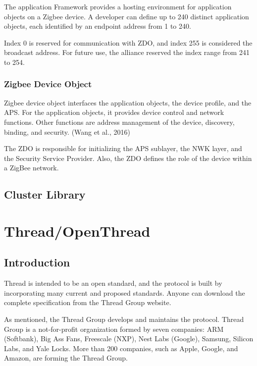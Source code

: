 The application Framework provides a hosting environment for application objects on a Zigbee device.
A developer can define up to 240 distinct application objects, each identified by an endpoint address from 1 to 240. 

Index 0 is reserved for communication with ZDO, and index 255 is considered the broadcast address.
For future use, the alliance reserved the index range from 241 to 254.

\subsubsection{Zigbee Device Object}
Zigbee device object interfaces the application objects, the device profile, and the APS. For the application objects, it provides device control and network functions. Other functions are address management of the device, discovery, binding, and security. (Wang et al., 2016)

The ZDO is responsible for initializing the APS sublayer, the NWK layer, and the Security Service Provider. Also, the ZDO defines the role of the device within a ZigBee network.
\subsection{Cluster Library}


\section{Thread/OpenThread}
\label{sec:ot}

\subsection{Introduction}
\label{sec:ot:intro}
Thread is intended to be an open standard, and the protocol is built by incorporating many
current and proposed standards.\cite{unwala:2018}
Anyone can download the complete specification from the Thread Group website. \cite{thread:130}

As mentioned, the Thread Group develops and maintains the protocol.
Thread Group is a not-for-profit organization formed by seven companies:
ARM (Softbank), Big Ass Fans, Freescale (NXP), Nest Labs (Google), Samsung, Silicon Labs, and Yale Locks.
More than 200 companies, such as Apple, Google, and Amazon, are forming the Thread Group. \cite{thread:members}

